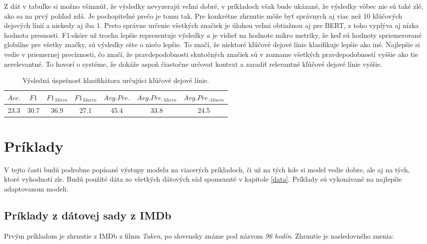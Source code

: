 Z dát v tabuľke si možno všimnúť, že výsledky nevyzerajú veľmi dobré, v príkladoch však bude ukázané, že výsledky vôbec nie sú také zlé, ako sa na prvý pohľad zdá. Je pochopiteľné prečo je tomu tak. Pre konkrétne zhrnutie môže byť správnych aj viac než 10 kľúčových dejových línií a niekedy aj iba 1. Preto správne určenie všetkých značiek je úlohou veľmi obtiažnou aj pre BERT, z toho vyplýva aj nízka hodnota presnosti. F1-skóre už trocha lepšie reprezentuje výsledky a je vidieť na hodnote mikro metriky, že keď sú hodnoty spriemerované globálne pre všetky značky, sú výsledky ešte o niečo lepšie. To značí, že niektoré kľúčové dejové línie klasifikuje lepšie ako iné. Najlepšie si vedie v priemernej precíznosti, čo značí, že pravdepodobnosti skutočných značiek sú v zozname všetkých pravdepodobností vyššie ako tie nerelevantné. To hovorí o systéme, že dokáže aspoň čiastočne určovať kontext a zaradiť relevantné kľúčové dejové línie vyššie. 


\begin{table}[hbt]
\centering
\caption{Výsledná úspešnosť klasifikátora určujúci kľúčové dejové línie.}
\label{vysledky}
\begin{tabular}{|c|c|c|c|c|c|c|}
\hline
\(Acc.\) & \(F1\) & \(F1_{Micro}\) & \(F1_{Macro}\) & \(Avg. Pre.\) & \(Avg. Pre._{Micro}\) &  \(Avg. Pre._{Macro}\) \\
\hline
23.3 & 30.7 & 36.9 & 27.1 & 45.4 & 33.8 & 24.5 \\ 
\hline

\end{tabular}
\end{table}

\section{Príklady}

V tejto časti budú podrobne popísané výstupy modelu na viacerých príkladoch, či už na tých kde si model vedie dobre, ale aj na tých, ktoré vyhodnotí zle. Budú použité dáta zo všetkých dátových sád spomenuté v kapitole \ref{data}. Príklady sú vykonávané na najlepšie adaptovanom modeli. 

\subsection*{Príklady z dátovej sady z IMDb}

Prvým príkladom je zhrnutie z IMDb z filmu \textit{Taken}, po slovensky známe pod názvom \textit{96 hodín}. Zhrnutie je nasledovného znenia:

